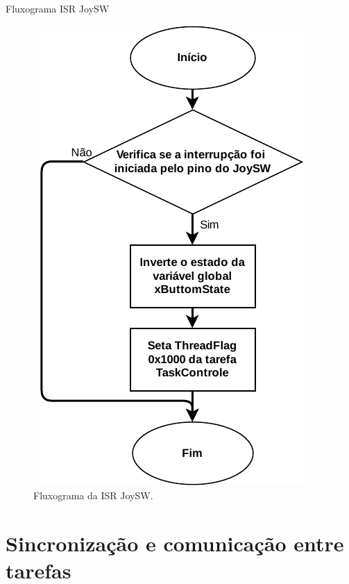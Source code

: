\documentclass{if-beamer}
\begin{document}
\begin{frame}{Fluxograma ISR JoySW}



\begin{figure}[H]
	\centering
	\includegraphics[height= 0.8\textheight]{img/fluxograma_joysw}
	\caption{Fluxograma da ISR JoySW.}
	\label{fig:fluxograma_joysw}
\end{figure}

\end{frame}



\section{Sincronização e comunicação entre tarefas}
\end{document}
